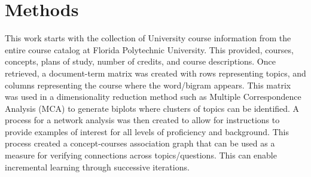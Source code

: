 \chapter{Methods}


This work starts with the collection of University course information from the entire course catalog at Florida Polytechnic University.  This provided, courses, concepts, plans of study, number of credits, and course descriptions. Once retrieved, a document-term matrix was created with rows representing topics, and columns representing the course where the word/bigram appears. This matrix was used in a dimensionality reduction method such as Multiple Correspondence Analysis (MCA) to generate biplots where clusters of topics can be identified. A process for a network analysis was then created to allow for instructions to provide examples of interest for all levels of proficiency and background. This process created a concept-courses association graph that can be used as a measure for verifying connections across topics/questions. This can enable incremental learning through successive iterations. 
